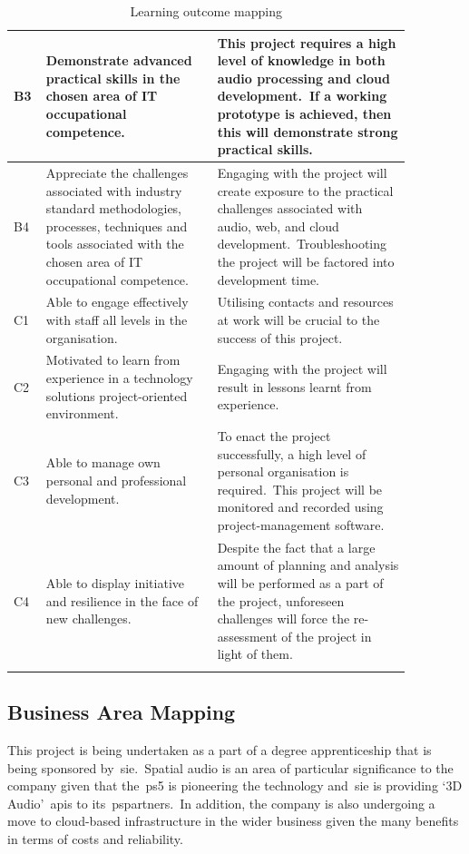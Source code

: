 \documentclass[a4paper, 12pt, british]{article}
\begin{document}
\begin{longtable}{| p{0.07\linewidth} | p{0.4\linewidth} | p{0.4\linewidth} |}
    \hline
    B3 & Demonstrate advanced practical skills in the chosen area of IT occupational competence.\ & This project requires a high level of knowledge in both audio processing and cloud development.\ If a working prototype is achieved, then this will demonstrate strong practical skills. \\
    \hline
    B4 & Appreciate the challenges associated with industry standard methodologies, processes, techniques and tools
    associated with the chosen area of IT occupational competence.\ & Engaging with the project will create exposure to the practical challenges associated with audio, web, and cloud development.\ Troubleshooting the project will be factored into development time.\\
    \hline
    \hline
    C1 & Able to engage effectively with staff all levels in the organisation.\ & Utilising contacts and resources at work will be crucial to the success of this project. \\
    \hline
    C2 & Motivated to learn from experience in a technology solutions project-oriented environment.\ & Engaging with the project will result in lessons learnt from experience. \\
    \hline
    C3 & Able to manage own personal and professional development.\ & To enact the project successfully, a high level of personal organisation is required.\ This project will be monitored and recorded using project-management software. \\
    \hline
    C4 & Able to display initiative and resilience in the face of new challenges.\ & Despite the fact that a large amount of planning and analysis will be performed as a part of the project, unforeseen challenges will force the re-assessment of the project in light of them. \\
    \hline

    \caption{Learning outcome mapping}
    \label{tab:lo_mapping}
\end{longtable}

\subsection{Business Area Mapping}\label{subsec:business-area-mapping}
This project is being undertaken as a part of a degree apprenticeship that is being sponsored by~\gls{sie}.\ Spatial audio is an area of particular significance to the company given that the~\gls{ps5} is pioneering the technology and~\gls{sie} is providing `3D Audio'~\glspl{api} to its~\glspl{pspartner}.\ In addition, the company is also undergoing a move to cloud-based infrastructure in the wider business given the many benefits in terms of costs and reliability.
\end{document}
